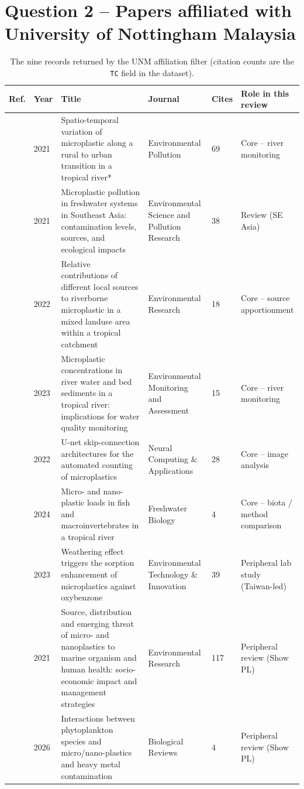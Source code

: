 \documentclass[11pt,a4paper]{article}
\begin{document}
\section{Question 2 -- Papers affiliated with University of Nottingham Malaysia}
\begin{table}[H]\centering\scriptsize
\begin{tabularx}{\textwidth}{@{}p{1.1cm}p{0.8cm}Xp{3.0cm}p{0.8cm}p{2.4cm}@{}}
\toprule Ref. & Year & Title & Journal & Cites & Role in this review \\\midrule
\cite{chen21a} & 2021 & Spatio-temporal variation of microplastic along a rural to urban transition in a tropical river* & Environmental Pollution & 69 & Core -- river monitoring \\
\cite{chen21b} & 2021 & Microplastic pollution in freshwater systems in Southeast Asia: contamination levels, sources, and ecological impacts & Environmental Science and Pollution Research & 38 & Review (SE Asia) \\
\cite{chen22} & 2022 & Relative contributions of different local sources to riverborne microplastic in a mixed landuse area within a tropical catchment & Environmental Research & 18 & Core -- source apportionment \\
\cite{chen23} & 2023 & Microplastic concentrations in river water and bed sediments in a tropical river: implications for water quality monitoring & Environmental Monitoring and Assessment & 15 & Core -- river monitoring \\
\cite{lee22} & 2022 & U-net skip-connection architectures for the automated counting of microplastics & Neural Computing \& Applications & 28 & Core -- image analysis \\
\cite{ng24} & 2024 & Micro- and nano-plastic loads in fish and macroinvertebrates in a tropical river & Freshwater Biology & 4 & Core -- biota / method comparison \\
\cite{hanun23} & 2023 & Weathering effect triggers the sorption enhancement of microplastics against oxybenzone & Environmental Technology \& Innovation & 39 & Peripheral lab study (Taiwan-led) \\
\cite{mofijur21} & 2021 & Source, distribution and emerging threat of micro- and nanoplastics to marine organism and human health: socio-economic impact and management strategies & Environmental Research & 117 & Peripheral review (Show PL) \\
\cite{alowaisy26} & 2026 & Interactions between phytoplankton species and micro/nano-plastics and heavy metal contamination & Biological Reviews & 4 & Peripheral review (Show PL) \\
\bottomrule\end{tabularx}
\caption{The nine records returned by the UNM affiliation filter (citation counts are the \texttt{TC} field in the dataset).}
\end{table}
\end{document}

